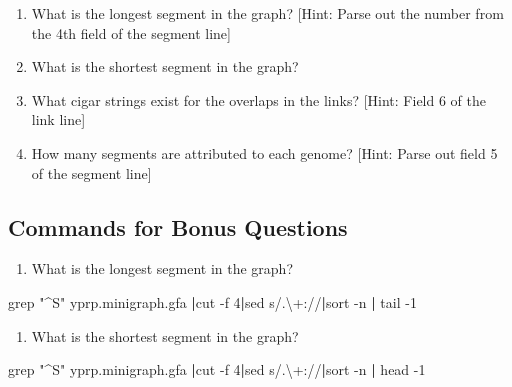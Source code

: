 \documentclass[
]{book}
\newenvironment{Shaded}{\begin{snugshade}}{\end{snugshade}}
\newcommand{\AttributeTok}[1]{\textcolor[rgb]{0.77,0.63,0.00}{#1}}
\newcommand{\FunctionTok}[1]{\textcolor[rgb]{0.00,0.00,0.00}{#1}}
\newcommand{\KeywordTok}[1]{\textcolor[rgb]{0.13,0.29,0.53}{\textbf{#1}}}
\newcommand{\NormalTok}[1]{#1}
\newcommand{\StringTok}[1]{\textcolor[rgb]{0.31,0.60,0.02}{#1}}
\providecommand{\tightlist}{%
  \setlength{\itemsep}{0pt}\setlength{\parskip}{0pt}}
\begin{document}
\begin{enumerate}
\def\labelenumi{\arabic{enumi}.}
\tightlist
\item
  What is the longest segment in the graph?
  {[}Hint: Parse out the number from the 4th field of the segment line{]}
\item
  What is the shortest segment in the graph?
\item
  What cigar strings exist for the overlaps in the links? {[}Hint:
  Field 6 of the link line{]}
\item
  How many segments are attributed to each genome? {[}Hint: Parse out field 5 of the segment line{]}
\end{enumerate}

\hypertarget{commands-for-bonus-questions}{%
\subsection*{Commands for Bonus Questions}\label{commands-for-bonus-questions}}

\begin{enumerate}
\def\labelenumi{\arabic{enumi}.}
\tightlist
\item
  What is the longest segment in the graph?
\end{enumerate}

\begin{Shaded}
\begin{Highlighting}[]
\FunctionTok{grep} \StringTok{"\^{}S"}\NormalTok{ yprp.minigraph.gfa }\KeywordTok{|}\FunctionTok{cut} \AttributeTok{{-}f}\NormalTok{ 4}\KeywordTok{|}\FunctionTok{sed} \StringTok{\textquotesingle{}s/.\textbackslash{}+://\textquotesingle{}}\KeywordTok{|}\FunctionTok{sort} \AttributeTok{{-}n} \KeywordTok{|} \FunctionTok{tail} \AttributeTok{{-}1}
\end{Highlighting}
\end{Shaded}

\begin{enumerate}
\def\labelenumi{\arabic{enumi}.}
\setcounter{enumi}{1}
\tightlist
\item
  What is the shortest segment in the graph?
\end{enumerate}

\begin{Shaded}
\begin{Highlighting}[]
\FunctionTok{grep} \StringTok{"\^{}S"}\NormalTok{ yprp.minigraph.gfa }\KeywordTok{|}\FunctionTok{cut} \AttributeTok{{-}f}\NormalTok{ 4}\KeywordTok{|}\FunctionTok{sed} \StringTok{\textquotesingle{}s/.\textbackslash{}+://\textquotesingle{}}\KeywordTok{|}\FunctionTok{sort} \AttributeTok{{-}n} \KeywordTok{|} \FunctionTok{head} \AttributeTok{{-}1}
\end{Highlighting}
\end{Shaded}
\end{document}
